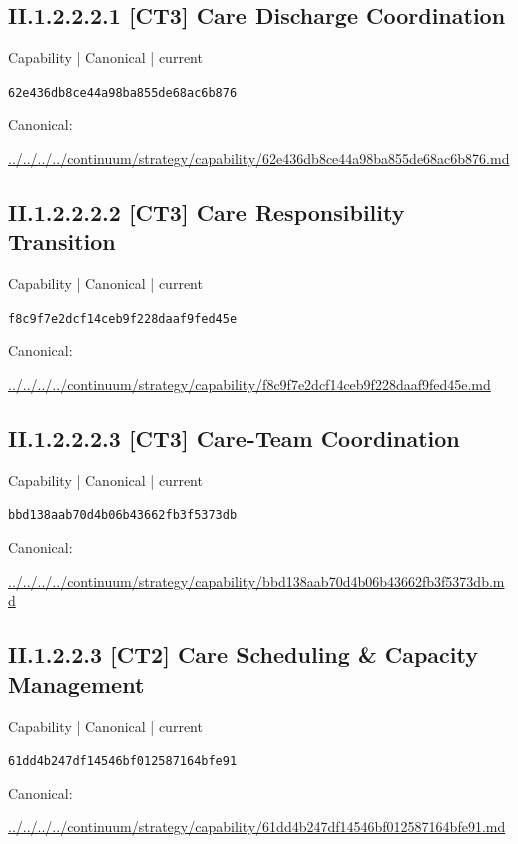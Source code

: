 \documentclass[10pt,a4paper]{article}
\begin{document}
\subsection*{II.1.2.2.2.1 [CT3] Care Discharge Coordination}
{\small Capability | Canonical | current}\par
\texttt{62e436db8ce44a98ba855de68ac6b876}\par
Canonical: \par
{\footnotesize\url{../../../../continuum/strategy/capability/62e436db8ce44a98ba855de68ac6b876.md}}\par
\subsection*{II.1.2.2.2.2 [CT3] Care Responsibility Transition}
{\small Capability | Canonical | current}\par
\texttt{f8c9f7e2dcf14ceb9f228daaf9fed45e}\par
Canonical: \par
{\footnotesize\url{../../../../continuum/strategy/capability/f8c9f7e2dcf14ceb9f228daaf9fed45e.md}}\par
\subsection*{II.1.2.2.2.3 [CT3] Care-Team Coordination}
{\small Capability | Canonical | current}\par
\texttt{bbd138aab70d4b06b43662fb3f5373db}\par
Canonical: \par
{\footnotesize\url{../../../../continuum/strategy/capability/bbd138aab70d4b06b43662fb3f5373db.md}}\par
\subsection*{II.1.2.2.3 [CT2] Care Scheduling \& Capacity Management}
{\small Capability | Canonical | current}\par
\texttt{61dd4b247df14546bf012587164bfe91}\par
Canonical: \par
{\footnotesize\url{../../../../continuum/strategy/capability/61dd4b247df14546bf012587164bfe91.md}}\par
\end{document}
